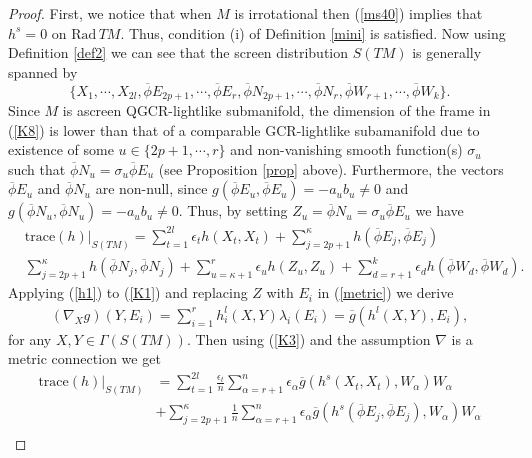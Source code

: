 \documentclass[reqno, 12pt]{amsart}
\numberwithin{equation}{section}
\begin{document}
\begin{proof}
 First, we notice that when $M$ is irrotational then (\ref{ms40}) implies that $h^{s}=0$ on $\mathrm{Rad} \,TM$. Thus, condition (i) of Definition \ref{mini} is satisfied.  Now using Definition \ref{def2}  we can see that the screen distribution $S(TM)$ is generally spanned by 
 \begin{equation}\label{K8}
 \{X_{1},\cdots,X_{2l},\overline{\phi}E_{2p+1},\cdots,\overline{\phi}E_{r},\overline{\phi}N_{2p+1},\cdots,\overline{\phi}N_{r}, \overline{\phi}W_{r+1}, \cdots,\overline{\phi}W_{k}\}.
 \end{equation}
  Since $M$ is ascreen QGCR-lightlike submanifold, the dimension of the frame in (\ref{K8}) is lower than that of a comparable GCR-lightlike subamanifold due to existence of some $u\in\{2p+1,\cdots,r\}$ and non-vanishing smooth function(s) $\sigma_{u}$ such that $\overline{\phi}N_{u}=\sigma_{u}\overline{\phi}E_{u}$ (see Proposition \ref{prop} above). Furthermore, the vectors $\overline{\phi}E_{u}$ and $\overline{\phi}N_{u}$ are non-null, since $g(\overline{\phi}E_{u},\overline{\phi}E_{u})=-a_{u}b_{u}\neq0$ and $g(\overline{\phi}N_{u},\overline{\phi}N_{u})=-a_{u}b_{u}\neq0$. Thus, by setting $Z_{u}=\overline{\phi}N_{u}=\sigma_{u}\overline{\phi}E_{u}$ we have
 \begin{align}\label{K1}
  &\mathrm{trace}(h)|_{S(TM)}=\sum_{t=1}^{2l}\epsilon_{t}h(X_{t},X_{t})+\sum_{j=2p+1}^{\kappa}h(\overline{\phi}E_{j},\overline{\phi}E_{j})\nonumber\\
   &\sum_{j=2p+1}^{\kappa}h(\overline{\phi}N_{j},\overline{\phi}N_{j})+ \sum_{u=\kappa+1}^{r}\epsilon_{u}h(Z_{u},Z_{u})+\sum_{d=r+1}^{k}\epsilon_{d}h(\overline{\phi}W_{d},\overline{\phi}W_{d}).
 \end{align}
Applying (\ref{h1}) to (\ref{K1}) and replacing $Z$ with $E_{i}$ in (\ref{metric}) we derive 
\begin{align}\label{K3}
         (\nabla_X g)(Y,E_{i})=\sum_{i=1}^{r} h_i^l(X,Y)\lambda_i(E_{i})=\overline{g}(h^{l}(X,Y),E_{i}),
\end{align}
for any $X,Y\in\Gamma(S(TM))$.
Then using (\ref{K3}) and the assumption $\nabla$ is a metric connection we get
 \begin{align}\label{K4}
  \mathrm{trace}(h)|_{S(TM)}&=\sum_{t=1}^{2l}\frac{\epsilon_{t}}{n}\sum_{\alpha=r+1}^{n}\epsilon_{\alpha}\overline{g}(h^{s}(X_{t},X_{t}),W_{\alpha})W_{\alpha}\nonumber\\
  &+\sum_{j=2p+1}^{\kappa}\frac{1}{n}\sum_{\alpha=r+1}^{n}\epsilon_{\alpha}\overline{g}(h^{s}(\overline{\phi}E_{j},\overline{\phi}E_{j}),W_{\alpha})W_{\alpha}\nonumber\\

\end{align}
\end{proof}
\end{document}
